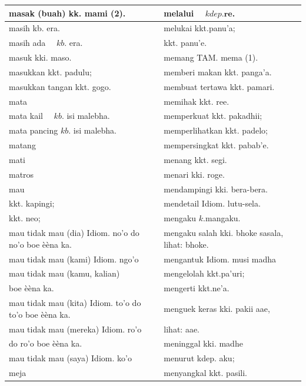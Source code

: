 \documentclass[10pt]{article}
\begin{document}
\begin{center}
\begin{tabular}{|l|l|}
\hline
masak (buah) kk. mami (2). & melalui \(\quad k d e p . \mathbf{r e}\). \\
\hline
masih kb. era. & melukai kkt.panu'a; \\
\hline
masih ada \(\quad k b\). era. & kkt. panu'e. \\
\hline
masuk kki. maso. & memang TAM. mema (1). \\
\hline
masukkan kkt. padulu; & memberi makan kkt. panga'a. \\
\hline
masukkan tangan kkt. gogo. & membuat tertawa kkt. pamari. \\
\hline
mata & memihak kkt. ree. \\
\hline
mata kail \(\quad k b\). isi malebha. & memperkuat kkt. pakadhii; \\
\hline
mata pancing \(k b\). isi malebha. & memperlihatkan kkt. padelo; \\
\hline
matang & mempersingkat kkt. pabab'e. \\
\hline
mati & menang kkt. segi. \\
\hline
matros & menari kki. roge. \\
\hline
mau & mendampingi kki. bera-bera. \\
\hline
kkt. kapingi; & mendetail Idiom. lutu-sela. \\
\hline
kkt. neo; & mengaku \(k\).mangaku. \\
\hline
mau tidak mau (dia) Idiom. no'o do no'o boe èèna ka. & mengaku salah kki. bhoke sasala, lihat: bhoke. \\
\hline
mau tidak mau (kami) Idiom. ngo'o & mengantuk Idiom. musi madha \\
\hline
mau tidak mau (kamu, kalian) & mengelolah kkt.pa'uri; \\
\hline
boe èèna ka. & mengerti kkt.ne'a. \\
\hline
mau tidak mau (kita) Idiom. to'o do to'o boe èèna ka. & menguek keras kki. pakii aae, \\
\hline
mau tidak mau (mereka) Idiom. ro'o & lihat: aae. \\
\hline
do ro'o boe èèna ka. & meninggal kki. madhe \\
\hline
mau tidak mau (saya) Idiom. ko'o & menurut kdep. aku; \\
\hline
meja & menyangkal kkt. pasili. \\
\hline
\end{tabular}
\end{center}
\end{document}
